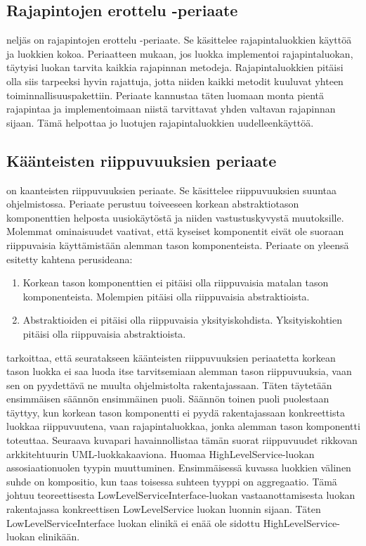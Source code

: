 \documentclass{tufte-book}
\begin{document}
\subsection{Rajapintojen erottelu -periaate}
\label{ISP}

 neljäs on \gls{rajapintojen erottelu -periaate}. Se käsittelee
rajapintaluokkien käyttöä ja luokkien kokoa. Periaatteen mukaan, jos luokka implementoi
rajapintaluokan, täytyisi luokan tarvita kaikkia rajapinnan metodeja. Rajapintaluokkien pitäisi
olla siis tarpeeksi hyvin rajattuja, jotta niiden kaikki metodit kuuluvat yhteen
toiminnallisuuspakettiin. Periaate kannustaa täten luomaan monta pientä rajapintaa ja
implementoimaan niistä tarvittavat yhden valtavan rajapinnan sijaan. Tämä helpottaa jo luotujen
rajapintaluokkien uudelleenkäyttöä.

\subsection{Käänteisten riippuvuuksien periaate}
\label{DIP}

 on \gls{kaanteisten riippuvuuksien periaate}. Se
käsittelee riippuvuuksien suuntaa ohjelmistossa. Periaate perustuu toiveeseen korkean
abstraktiotason komponenttien helposta uusiokäytöstä ja niiden vastustuskyvystä muutoksille.
Molemmat ominaisuudet vaativat, että kyseiset komponentit eivät ole suoraan riippuvaisia
käyttämistään alemman tason komponenteista. Periaate on yleensä esitetty kahtena perusideana:

\begin{enumerate}
	\item Korkean tason komponenttien ei pitäisi olla riippuvaisia matalan tason komponenteista. Molempien pitäisi olla riippuvaisia abstraktioista.
	\item Abstraktioiden ei pitäisi olla riippuvaisia yksityiskohdista. Yksityiskohtien pitäisi olla riippuvaisia abstraktioista.
\end{enumerate}

 tarkoittaa, että seuratakseen käänteisten riippuvuuksien periaatetta
korkean tason luokka ei saa luoda itse tarvitsemiaan alemman tason riippuvuuksia, vaan sen on
pyydettävä ne muulta ohjelmistolta rakentajassaan. Täten täytetään ensimmäisen säännön ensimmäinen
puoli. Säännön toinen puoli puolestaan täyttyy, kun korkean tason komponentti ei pyydä
rakentajassaan konkreettista luokkaa riippuvuutena, vaan rajapintaluokkaa, jonka alemman tason
komponentti toteuttaa. Seuraava kuvapari havainnollistaa tämän suorat riippuvuudet rikkovan
arkkitehtuurin \gls{UML}-luokkakaaviona. Huomaa HighLevelService-luokan assosiaationuolen tyypin
muuttuminen. Ensimmäisessä kuvassa luokkien välinen suhde on \gls{kompositio}, kun taas toisessa
suhteen tyyppi on \gls{aggregaatio}. Tämä johtuu teoreettisesta LowLevelServiceInterface-luokan
vastaanottamisesta luokan rakentajassa konkreettisen LowLevelService luokan luonnin sijaan.
Täten LowLevelServiceInterface luokan elinikä ei enää ole sidottu HighLevelService-luokan
elinikään.
\end{document}
